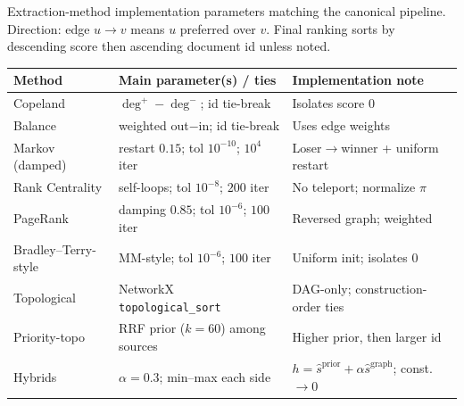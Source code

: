 \begin{supplementtable}
  \caption{Extraction-method implementation parameters matching the
    canonical pipeline. Direction: edge $u\to v$ means $u$ preferred over
    $v$. Final ranking sorts by descending score then ascending document id
    unless noted.}
  \label{tab:extraction-params}
  \sncstable\renewcommand{\arraystretch}{1.25}
  \begin{tabularx}{\linewidth}{@{}lYY@{}}
    \toprule
    Method & Main parameter(s) / ties & Implementation note \\
    \midrule
    Copeland & $\deg^+-\deg^-$; id tie-break & Isolates score $0$ \\
    \addlinespace
    Balance & weighted out$-$in; id tie-break & Uses edge weights \\
    \addlinespace
    Markov (damped) & restart $0.15$; tol $10^{-10}$; $10^{4}$ iter & Loser$\to$winner + uniform restart \\
    \addlinespace
    Rank Centrality & self-loops; tol $10^{-8}$; $200$ iter & No teleport; normalize $\pi$ \\
    \addlinespace
    PageRank & damping $0.85$; tol $10^{-6}$; $100$ iter & Reversed graph; weighted \\
    \addlinespace
    Bradley--Terry-style & MM-style; tol $10^{-6}$; $100$ iter & Uniform init; isolates $0$ \\
    \addlinespace
    Topological & NetworkX \texttt{topological\_sort} & DAG-only; construction-order ties \\
    \addlinespace
    Priority-topo & RRF prior ($k{=}60$) among sources & Higher prior, then larger id \\
    \addlinespace
    Hybrids & $\alpha{=}0.3$; min--max each side & $h=\hat s^{\mathrm{prior}}+\alpha\hat s^{\mathrm{graph}}$; const.\ $\to 0$ \\
    \bottomrule
  \end{tabularx}
\end{supplementtable}